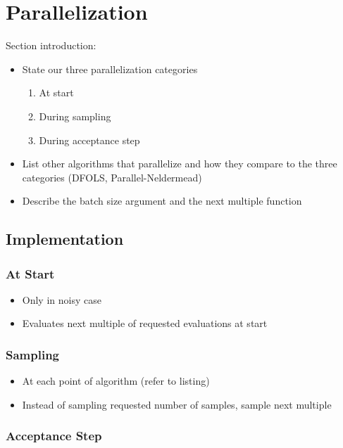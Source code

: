 \section{Parallelization}\label{sec:parallelization}

Section introduction:
\begin{itemize}
    \item State our three parallelization categories
        \begin{enumerate}
            \item At start
            \item During sampling
            \item During acceptance step
        \end{enumerate}
    \item List other algorithms that parallelize and how they compare to the three categories
        (DFOLS, Parallel-Neldermead)
    \item Describe the batch size argument and the next multiple function
\end{itemize}

\subsection{Implementation}\label{subsec:parallelization::implementation}

\subsubsection{At Start}

\begin{itemize}
    \item Only in noisy case
    \item Evaluates next multiple of requested evaluations at start
\end{itemize}

\subsubsection{Sampling}

\begin{itemize}
    \item At each point of algorithm (refer to listing)
    \item Instead of sampling requested number of samples, sample next multiple
\end{itemize}


\subsubsection{Acceptance Step}

